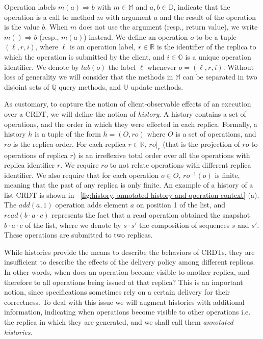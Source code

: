 Operation labels \mbox{$m(a)\Rightarrow b$} with $m \in \mathbb{M}$ and $a,b \in
\mathbb{D}$, indicate that the operation is a call to method $m$
with argument $a$ and the result of the operation is the value
$b$.
When $m$ does not use the argument (resp., return value), we write
$m()\Rightarrow b$ (resp., $m(a)$) instead.
We define an operation $o$ to be a tuple $(\ell,r,i)$, where $\ell$ is
an operation label, $r \in \mathbb{R}$ is the identifier of the
replica to which the operation is submitted by the client, and $i \in \mathbb{O}$ is a
unique operation identifier.
We denote by $\mathit{lab}(o)$ the label $\ell$ whenever $o = (\ell,
r, i)$.
%
Without loss of generality we will consider that the methods in
$\mathbb{M}$ can be separated in two disjoint sets of $\mathbb{Q}$
query methods, and $\mathbb{U}$ update methods.

As customary, to capture the notion of client-observable effects of an
execution over a CRDT, we will define the notion of \emph{history}.
%
A history contains a set of operations, and the order in which
they were effected in each replica.
%
Formally, a history $h$ is a tuple of the form $h = (O,\mathit{ro})$
where $O$ is a set of operations, and $\mathit{ro}$ is the replica
order.
%
For each replica $r \in \mathbb{R}$, $\mathit{ro}|_{r}$ (that is the
projection of $ro$ to operations of replica $r$) is an irreflexive
total order over all the operations with replica identifier $r$.
%
We require $\mathit{ro}$ to not relate operations with different replica identifier.
%
We also require that for each operation $o \in O$,
$\mathit{ro}^{-1}(o)$ is finite, meaning that the past of any replica
is only finite.
An example of a history of a list CRDT is shown in
\figurename~\ref{fig:history, annotated history and operation context} (a).
The $\mathit{add}(a,1)$ operation adds element $a$
on position 1 of the list, and $\mathit{read}(b\cdot a \cdot c)$
represents the fact that a read operation obtained the snapshot
$b\cdot a \cdot c$ of the list, where we denote by $s \cdot s'$ the
composition of sequences $s$ and $s'$. These operations are submitted
to two replicas.

While histories provide the means to describe the behaviors of CRDTs,
they are insufficient to describe the effects of the delivery
policy among different replicas.
%
In other words, when does an operation become visible to another
replica, and therefore to all operations being issued at that replica?
%
This is an important notion, since specifications sometimes rely on a
certain delivery for their correctness.
%
To deal with this issue we will augment histories with additional
information, indicating when operations become visible to other
operations i.e. the replica in which they are generated, and we
shall call them \emph{annotated histories}.
%

